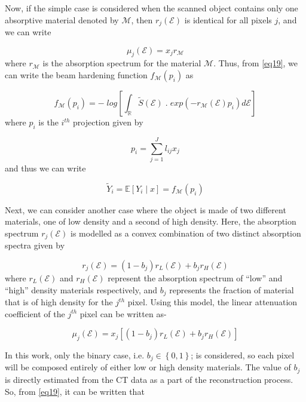 Now, if the simple case is considered when the scanned object contains only one absorptive material denoted by $\mathcal{M}$, then $r_j(\mathcal{E})$ is identical for all pixels $j$, and we can write

\begin{equation}
\label{eq24}
\mu_{j}(\mathcal{E}) = x_j r_\mathcal{M}
\end{equation} where $r_\mathcal{M}$ is the absorption spectrum for the material $\mathcal{M}$. Thus, from \ref{eq19}, we can write the beam hardening function $f_\mathcal{M}(p_i)$ as

\begin{equation}
\label{eq25}
f_\mathcal{M}(p_i) = - \; log \left[ \int_{\mathbb{R}} \widetilde{S}(\mathcal{E}) \; . \; exp \left(- r_\mathcal{M}(\mathcal{E}) p_i  \right) d\mathcal{E}  \right]
\end{equation} where $p_i$ is the $i^{th}$ projection given by


\begin{equation}
\label{eq26}
p_i = \sum\limits_{j=1}^J l_{ij} x_j
\end{equation} and thus we can write

\begin{equation}
\label{eq27}
\widetilde{Y}_{i} = \mathbb{E} \left[ Y_i\mid x \right] = f_\mathcal{M}(p_i) 
\end{equation} 
 
 
Next, we can consider another case where the object is made of two different materials, one of low density and a second of high density. Here, the absorption spectrum $r_j(\mathcal{E})$ is modelled as a convex combination of two distinct absorption spectra given by


\begin{equation}
\label{eq28}
r_j(\mathcal{E})= (1-b_j)r_L(\mathcal{E}) + b_j r_H(\mathcal{E})
\end{equation} where $r_L(\mathcal{E})$ and $r_H(\mathcal{E})$ represent  the absorption spectrum of ``low'' and ``high'' density materials respectively, and $b_j$ represents the fraction of material that is of high density for the $j^{th}$ pixel. Using this model, the linear attenuation coefficient of the $j^{th}$ pixel can be written as- 

\begin{equation}
\label{eq29}
\mu_j(\mathcal{E})= x_j \left[(1-b_j)r_L(\mathcal{E}) + b_j r_H(\mathcal{E})\right]
\end{equation}

In this work, only the binary case, i.e. $b_j \in \left\lbrace 0 , 1 \right\rbrace $; is considered, so each pixel will be composed entirely of either low or high density materials. The value of $b_j$ is directly estimated from the CT data as a part of the reconstruction process. So, from \ref{eq19}, it can be written that 

